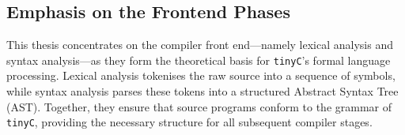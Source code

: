 \subsection{Emphasis on the Frontend Phases}

This thesis concentrates on the compiler front end—namely lexical analysis and syntax analysis—as they form the theoretical basis for \texttt{tinyC}’s formal language processing. Lexical analysis tokenises the raw source into a sequence of symbols, while syntax analysis parses these tokens into a structured Abstract Syntax Tree (AST). Together, they ensure that source programs conform to the grammar of \texttt{tinyC}, providing the necessary structure for all subsequent compiler stages.


\pagebreak
